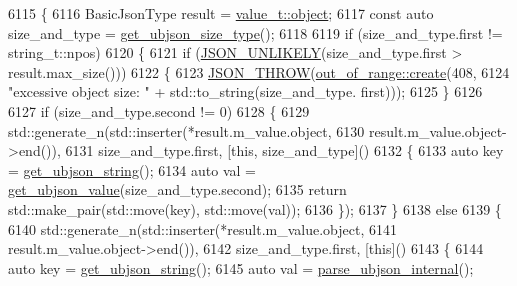 \begin{DoxyCode}
6115     \{
6116         BasicJsonType result = \hyperlink{namespacenlohmann_1_1detail_a1ed8fc6239da25abcaf681d30ace4985aa8cfde6331bd59eb2ac96f8911c4b666}{value\_t::object};
6117         \textcolor{keyword}{const} \textcolor{keyword}{auto} size\_and\_type = \hyperlink{classnlohmann_1_1detail_1_1binary__reader_a480aae640bb92a7432c0f758081a2cc7}{get\_ubjson\_size\_type}();
6118 
6119         \textcolor{keywordflow}{if} (size\_and\_type.first != string\_t::npos)
6120         \{
6121             \textcolor{keywordflow}{if} (\hyperlink{json_8hpp_ab77582407c64944e7db1ea95ab520253}{JSON\_UNLIKELY}(size\_and\_type.first > result.max\_size()))
6122             \{
6123                 \hyperlink{json_8hpp_a6c274f6db2e65c1b66c7d41b06ad690f}{JSON\_THROW}(\hyperlink{classnlohmann_1_1detail_1_1out__of__range_a3f6d82a6f967c4728a1ec735a7867073}{out\_of\_range::create}(408,
6124                                                 \textcolor{stringliteral}{"excessive object size: "} + std::to\_string(size\_and\_type.
      first)));
6125             \}
6126 
6127             \textcolor{keywordflow}{if} (size\_and\_type.second != 0)
6128             \{
6129                 std::generate\_n(std::inserter(*result.m\_value.object,
6130                                               result.m\_value.object->end()),
6131                                 size\_and\_type.first, [\textcolor{keyword}{this}, size\_and\_type]()
6132                 \{
6133                     \textcolor{keyword}{auto} key = \hyperlink{classnlohmann_1_1detail_1_1binary__reader_ae4097317b979174cc366b076bb879814}{get\_ubjson\_string}();
6134                     \textcolor{keyword}{auto} val = \hyperlink{classnlohmann_1_1detail_1_1binary__reader_ad8507c0dd14bbddc76c7937c0305a15a}{get\_ubjson\_value}(size\_and\_type.second);
6135                     \textcolor{keywordflow}{return} std::make\_pair(std::move(key), std::move(val));
6136                 \});
6137             \}
6138             \textcolor{keywordflow}{else}
6139             \{
6140                 std::generate\_n(std::inserter(*result.m\_value.object,
6141                                               result.m\_value.object->end()),
6142                                 size\_and\_type.first, [\textcolor{keyword}{this}]()
6143                 \{
6144                     \textcolor{keyword}{auto} key = \hyperlink{classnlohmann_1_1detail_1_1binary__reader_ae4097317b979174cc366b076bb879814}{get\_ubjson\_string}();
6145                     \textcolor{keyword}{auto} val = \hyperlink{classnlohmann_1_1detail_1_1binary__reader_a439e369278be4412b05f3481c226eafa}{parse\_ubjson\_internal}();

\end{DoxyCode}
